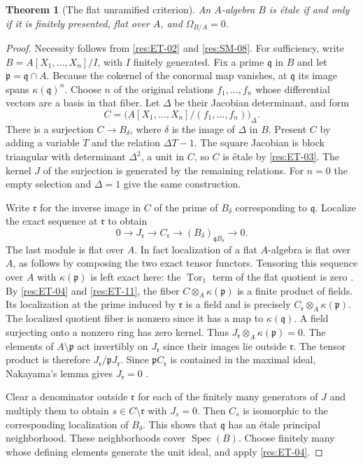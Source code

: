 \documentclass[11pt,oneside,openany]{book}
\newtheorem{theorem}{Theorem}[chapter]
\theoremstyle{definition}
\theoremstyle{remark}
\begin{document}
\begin{theorem}[The flat unramified criterion]\label{res:ET-12}
An $A$-algebra $B$ is \'{e}tale if and only if it is finitely
presented, flat over $A$, and $\Omega_{B/A}=0$.
\end{theorem}
\begin{proof}
Necessity follows from \ref{res:ET-02} and \ref{res:SM-08}.
For sufficiency, write $B=A[X_1,\ldots,X_n]/I$, with $I$ finitely
generated. Fix a prime $\mathfrak q$ in $B$ and let
$\mathfrak p=\mathfrak q\cap A$. Because the cokernel of the
conormal map vanishes, at $\mathfrak q$ its image spans
$\kappa(\mathfrak q)^n$. Choose $n$ of the original relations
$f_1,\ldots,f_n$ whose differential vectors are a basis in
that fiber. Let $\Delta$ be their Jacobian determinant, and form
\[
 C=\big(A[X_1,\ldots,X_n]/(f_1,\ldots,f_n)\big)_\Delta.
\]
There is a surjection $C\to B_\delta$, where $\delta$ is the
image of $\Delta$ in $B$. Present $C$ by adding a variable $T$
and the relation $\Delta T-1$. The square Jacobian is block
triangular with determinant $\Delta^2$, a unit in $C$, so
$C$ is \'{e}tale by \ref{res:ET-03}. The kernel $J$ of the
surjection is generated by the remaining relations.
For $n=0$ the empty selection and $\Delta=1$ give the same
construction.

Write $\mathfrak r$ for the inverse image in $C$ of the prime of
$B_\delta$ corresponding to $\mathfrak q$. Localize the exact
sequence at $\mathfrak r$ to obtain
\[
 0\longrightarrow J_{\mathfrak r}\longrightarrow C_{\mathfrak r}
   \longrightarrow (B_\delta)_{\mathfrak q B_\delta}
   \longrightarrow0 .
\]
The last module is flat over $A$. In fact localization of a flat
$A$-algebra is flat over $A$, as follows by composing the two exact
tensor functors. Tensoring this sequence over $A$ with
$\kappa(\mathfrak p)$ is left exact here: the $\operatorname{Tor}_1$
term of the flat quotient is zero \cite[Chapter 11]{p103}.
By \ref{res:ET-04} and \ref{res:ET-11}, the fiber
$C\otimes_A\kappa(\mathfrak p)$ is a finite product of fields.
Its localization at the prime induced by $\mathfrak r$ is a
field and is precisely $C_{\mathfrak r}\otimes_A\kappa(\mathfrak p)$.
The localized quotient fiber is nonzero since it has a map to
$\kappa(\mathfrak q)$. A field surjecting onto a nonzero ring
has zero kernel. Thus $J_{\mathfrak r}\otimes_A\kappa(\mathfrak p)=0$.
The elements of $A\setminus\mathfrak p$ act invertibly on
$J_{\mathfrak r}$ since their images lie outside $\mathfrak r$.
The tensor product is therefore $J_{\mathfrak r}/\mathfrak pJ_{\mathfrak r}$.
Since $\mathfrak pC_{\mathfrak r}$ is contained in the maximal
ideal, Nakayama's lemma gives $J_{\mathfrak r}=0$
\cite[Chapter 7]{p103}.

Clear a denominator outside $\mathfrak r$ for each of the finitely
many generators of $J$ and multiply them to obtain
$s\in C\setminus\mathfrak r$ with $J_s=0$. Then $C_s$ is
isomorphic to the corresponding localization of $B_\delta$.
This shows that $\mathfrak q$ has an \'{e}tale principal
neighborhood. These neighborhoods cover $\operatorname{Spec}(B)$.
Choose finitely many whose defining elements generate the unit ideal,
and apply \ref{res:ET-04}.
\end{proof}
\end{document}
